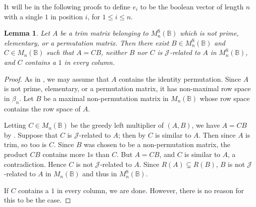 \documentclass[11pt]{article}
\newtheorem{lemma}[thm]{Lemma}
\numberwithin{equation}{section}
\newcommand{\B}{\mathbb{B}}
\newcommand{\Bn}{M_n(\B)}
\newcommand{\Halln}{M_n^{\text{S}}(\B)}
\newcommand{\J}{\mathscr{J}}
\begin{document}
It will be in the following proofs to define $e_i$ to be the boolean vector of
length $n$ with a single $1$ in position $i$, for $1 \leq i \leq n$.

\begin{lemma}
  Let $A$ be a trim matrix belonging to $\Halln$ which is not prime, elementary, or a
  permutation matrix. Then there exist $B \in \Halln$ and $C \in \Bn$ such that
  $A = CB$, neither $B$ nor $C$ is $\J$-related to $A$ in $\Halln$, and $C$
  contains a $1$ in every column.
\end{lemma}
\begin{proof}
  As in , we may assume that $A$ contains the
  identity permutation. Since $A$ is not prime, elementary, or a permutation
  matrix, it has non-maximal row space in $\beta_n$. Let $B$ be a maximal
  non-permutation matrix in $\Bn$ whose row space contains the row space of $A$.

  Letting $C \in \Bn$ be the greedy left multiplier of $(A, B)$, we have $A = CB$ by
  . Suppose that $C$ is $\J$-related to $A$; then
  by  $C$ is similar to $A$. Then since $A$ is trim, so
  too is $C$. Since $B$ was chosen to be a non-permutation matrix, the product
  $CB$ contains more $1$s than $C$. But $A = CB$, and $C$ is similar to $A$, a
  contradiction. Hence $C$ is not $\J$-related to $A$. Since $R(A) \subsetneq
  R(B)$, $B$ is not $\J$-related to $A$ in $\Bn$ and thus in $\Halln$.

  If $C$ contains a $1$ in every column, we are done. However, there is no
  reason for this to be the case.


\end{proof}
\end{document}
